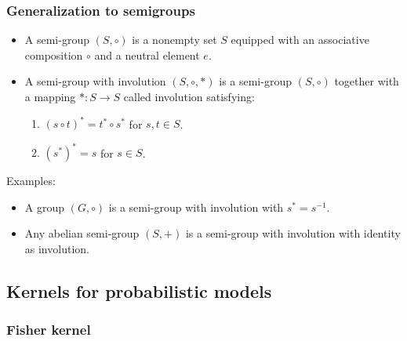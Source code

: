 \documentclass[10pt]{article}
\begin{document}
\subsubsection{Generalization to semigroups}
\begin{Definition}{}{}
  \begin{itemize}
    \item A semi-group $(S,\circ)$ is a nonempty set $S$ equipped with an 
    associative composition $\circ$ and a neutral element $e$.
    \item A semi-group with involution $(S,\circ, *)$ is a semi-group 
    $(S,\circ)$ together with a mapping $*:S\rightarrow S$ called involution 
    satisfying:
    \begin{enumerate}
      \item $(s\circ t )^* = t^* \circ s^*$ for $s,t\in S$.
      \item $(s^*)^* = s$ for $s\in S$.
    \end{enumerate}
  \end{itemize}
  
  Examples:
  \begin{itemize}
    \item A group $(G, \circ)$ is a semi-group with involution with $s^* = 
    s^{-1}$.
    \item Any abelian semi-group $(S, +)$ is a semi-group with involution with 
    identity as involution.
  \end{itemize}
\end{Definition}

\subsection{Kernels for probabilistic models}
\subsubsection{Fisher kernel}
\end{document}
